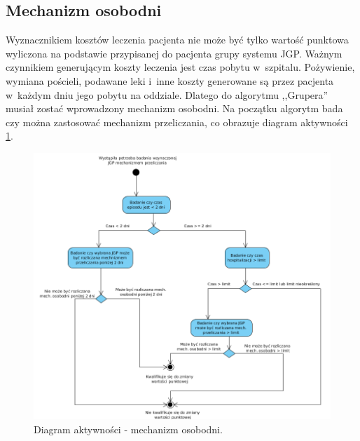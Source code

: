 \subsection{Mechanizm osobodni}
\label{sec:mechanizmOsobodni}
Wyznacznikiem kosztów leczenia pacjenta nie może być tylko wartość punktowa wyliczona na podstawie przypisanej do pacjenta grupy systemu JGP. Ważnym czynnikiem generującym koszty leczenia jest czas pobytu w~szpitalu. Pożywienie, wymiana pościeli, podawane leki i~inne koszty generowane są przez pacjenta w~każdym dniu jego pobytu na oddziale. Dlatego do algorytmu ,,Grupera'' musiał zostać wprowadzony mechanizm osobodni\cite{szkoleniaJGP}. Na początku algorytm bada czy można zastosować mechanizm przeliczania, co obrazuje diagram aktywności \ref{img:diagram_activity_maday}.

\begin{figure}[!ht]
\centering
\includegraphics[scale=0.5]{images/activity-manday}
\caption[Diagram aktywności]{Diagram aktywności - mechanizm osobodni.}
\label{img:diagram_activity_maday}
\end{figure}

